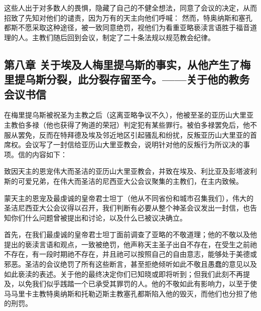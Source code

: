 这些人出于对多数人的畏惧，隐藏了自己的不健全想法，同意了会议的决定，从而招致了先知对他们的谴责，因为万有的天主向他们呼喊： 然而，特奥纳斯和塞孔都斯不愿采取这种途径，被一致同意绝罚，视他们为看重亚略亵渎言语胜于福音道理的人。主教们随后回到会议，制定了二十条法规以规范教会纪律。\par


\subsection{第八章  关于埃及人梅里提乌斯的事实，从他产生了梅里提乌斯分裂，此分裂存留至今。——关于他的教务会议书信}

在梅里提乌斯被祝圣为主教之后（这离亚略争议不久），他被至圣的亚历山大里亚主教伯多禄（他也获得了殉道的荣冠）判定犯有某些罪行。被伯多禄罢免后，他不服从罢免，反而在特拜德及埃及邻近地区引起骚乱和纷扰，反叛亚历山大里亚的首席权。会议写了一封信给亚历山大里亚教会，说明针对他的反叛行为所议决的事项。信的内容如下：\par

\par

致因天主的恩宠伟大而圣洁的亚历山大里亚教会，并致在埃及、利比亚及彭塔波利斯的可爱兄弟，在伟大而圣洁的尼西亚大公会议聚集的主教们，在主内致候。\par

蒙天主的恩宠及最虔诚的皇帝君士坦丁（他从不同省份和城市召集我们），伟大的圣洁尼西亚大公会议得以召开，我们判断有必要从整个神圣会议发出一封信，也告知你们什么问题曾被提出和讨论，以及什么已被议决确立。\par

首先，在我们最虔诚的皇帝君士坦丁面前调查了亚略的不敬道理；他的不敬以及他提出的亵渎言语和观点，一致被绝罚，他声称天主圣子出自不存在，在受生之前祂不存在，有一段时期祂不存在，并且祂可以按照自己的自由意志，能够处于美德或邪恶。圣洁的会议绝罚了所有这些断言，甚至拒绝倾听如此不敬且愚蠢的意见以及如此亵渎的表述。关于他的最终决定你们已知晓或即将听到；但我们此刻不再提及，以免我们似乎践踏一个已承受其罪罚的人。他的不敬如此有影响力，以至于使马马里卡主教特奥纳斯和托勒迈斯主教塞孔都斯陷入他的毁灭，而他们也分担了他的刑罚。\par

